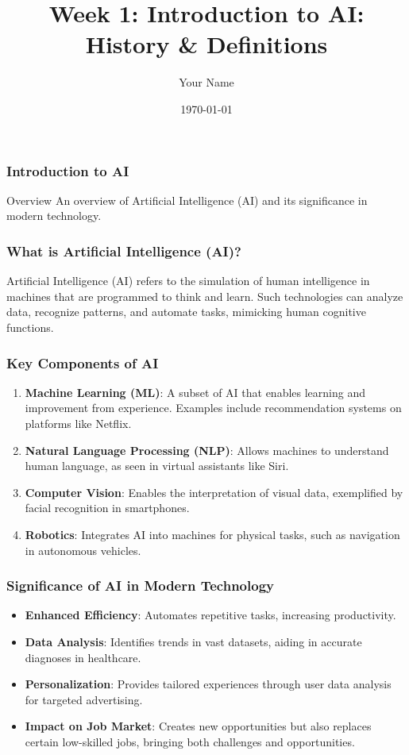 \documentclass{beamer}
\title{Week 1: Introduction to AI: History \& Definitions}
\author{Your Name}
\institute{Your Institution}
\date{\today}
\begin{document}
\frame{\titlepage}

\begin{frame}[fragile]
    \frametitle{Introduction to AI}
    \begin{block}{Overview}
        An overview of Artificial Intelligence (AI) and its significance in modern technology.
    \end{block}
\end{frame}

\begin{frame}[fragile]
    \frametitle{What is Artificial Intelligence (AI)?}
    Artificial Intelligence (AI) refers to the simulation of human intelligence in machines that are programmed to think and learn. Such technologies can analyze data, recognize patterns, and automate tasks, mimicking human cognitive functions.
\end{frame}

\begin{frame}[fragile]
    \frametitle{Key Components of AI}
    \begin{enumerate}
        \item \textbf{Machine Learning (ML)}: A subset of AI that enables learning and improvement from experience. Examples include recommendation systems on platforms like Netflix.
        
        \item \textbf{Natural Language Processing (NLP)}: Allows machines to understand human language, as seen in virtual assistants like Siri.
        
        \item \textbf{Computer Vision}: Enables the interpretation of visual data, exemplified by facial recognition in smartphones.
        
        \item \textbf{Robotics}: Integrates AI into machines for physical tasks, such as navigation in autonomous vehicles.
    \end{enumerate}
\end{frame}

\begin{frame}[fragile]
    \frametitle{Significance of AI in Modern Technology}
    \begin{itemize}
        \item \textbf{Enhanced Efficiency}: Automates repetitive tasks, increasing productivity.
        
        \item \textbf{Data Analysis}: Identifies trends in vast datasets, aiding in accurate diagnoses in healthcare.
        
        \item \textbf{Personalization}: Provides tailored experiences through user data analysis for targeted advertising.
        
        \item \textbf{Impact on Job Market}: Creates new opportunities but also replaces certain low-skilled jobs, bringing both challenges and opportunities.
    \end{itemize}
\end{frame}
\end{document}
